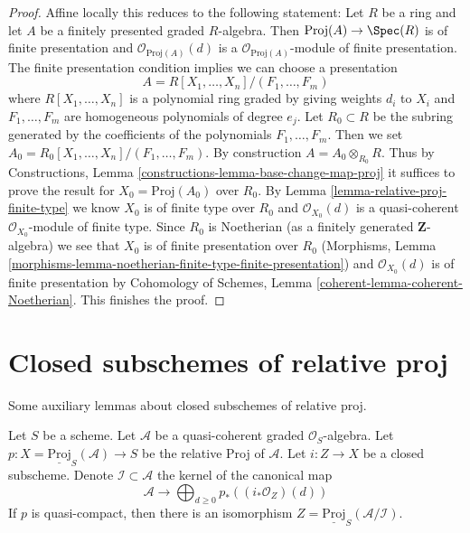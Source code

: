 \begin{proof}
Affine locally this reduces to the following statement:
Let $R$ be a ring and let $A$ be a finitely presented graded $R$-algebra.
Then $\text{Proj}(A) \to \Spec(R)$ is of finite presentation
and $\mathcal{O}_{\text{Proj}(A)}(d)$ is a
$\mathcal{O}_{\text{Proj}(A)}$-module of finite presentation.
The finite presentation condition implies we can choose
a presentation
$$
A = R[X_1, \ldots, X_n]/(F_1, \ldots, F_m)
$$
where $R[X_1, \ldots, X_n]$ is a polynomial ring graded by giving
weights $d_i$ to $X_i$ and $F_1, \ldots, F_m$ are homogeneous polynomials
of degree $e_j$. Let $R_0 \subset R$ be the subring generated by
the coefficients of the polynomials $F_1, \ldots, F_m$.
Then we set $A_0 = R_0[X_1, \ldots, X_n]/(F_1, \ldots, F_m)$.
By construction $A = A_0 \otimes_{R_0} R$.
Thus by
Constructions, Lemma \ref{constructions-lemma-base-change-map-proj}
it suffices to prove the result for $X_0 = \text{Proj}(A_0)$ over $R_0$.
By Lemma \ref{lemma-relative-proj-finite-type}
we know $X_0$ is of finite type over $R_0$ and
$\mathcal{O}_{X_0}(d)$ is a quasi-coherent $\mathcal{O}_{X_0}$-module
of finite type.
Since $R_0$ is Noetherian (as a finitely generated $\mathbf{Z}$-algebra)
we see that $X_0$ is of finite presentation over $R_0$
(Morphisms, Lemma
\ref{morphisms-lemma-noetherian-finite-type-finite-presentation})
and $\mathcal{O}_{X_0}(d)$ is of finite presentation by
Cohomology of Schemes, Lemma \ref{coherent-lemma-coherent-Noetherian}.
This finishes the proof.
\end{proof}










\section{Closed subschemes of relative proj}
\label{section-closed-in-relative-proj}

\noindent
Some auxiliary lemmas about closed subschemes of relative proj.

\begin{lemma}
\label{lemma-closed-subscheme-proj}
Let $S$ be a scheme. Let $\mathcal{A}$ be a quasi-coherent graded
$\mathcal{O}_S$-algebra. Let
$p : X = \underline{\text{Proj}}_S(\mathcal{A}) \to S$ be the relative
Proj of $\mathcal{A}$. Let $i : Z \to X$ be a closed subscheme. Denote
$\mathcal{I} \subset \mathcal{A}$ the kernel of the canonical map
$$
\mathcal{A}
\longrightarrow
\bigoplus\nolimits_{d \geq 0} p_*\left((i_*\mathcal{O}_Z)(d)\right)
$$
If $p$ is quasi-compact, then there is an isomorphism
$Z = \underline{\text{Proj}}_S(\mathcal{A}/\mathcal{I})$.
\end{lemma}

